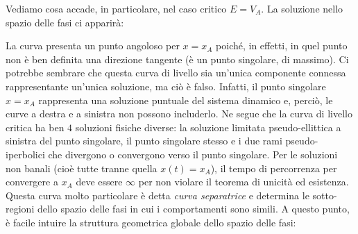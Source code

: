 \documentclass[a4paper,openany]{article}
\begin{document}
	Vediamo cosa accade, in particolare, nel caso critico $E=V_{A}$. La soluzione nello spazio delle fasi ci apparirà:
	\begin{figure}[H]
		\centering
	\end{figure}
	La curva presenta un punto angoloso per $x = x_{A}$ poiché, in effetti, in quel punto non è ben definita una direzione tangente (è un punto singolare, di massimo). Ci potrebbe sembrare che questa curva di livello sia un'unica componente connessa rappresentante un'unica soluzione, ma ciò è falso. Infatti, il punto singolare $x=x_{A}$ rappresenta una soluzione puntuale del sistema dinamico e, perciò, le curve a destra e a sinistra non possono includerlo. Ne segue che la curva di livello critica ha ben $4$ soluzioni fisiche diverse: la soluzione limitata pseudo-ellittica a sinistra del punto singolare, il punto singolare stesso e i due rami pseudo-iperbolici che divergono o convergono verso il punto singolare. Per le soluzioni non banali (cioè tutte tranne quella $x(t) = x_{A}$), il tempo di percorrenza per convergere a $x_{A}$ deve essere $\infty$ per non violare il teorema di unicità ed esistenza. Questa curva molto particolare è detta \textit{curva separatrice} e determina le sotto-regioni dello spazio delle fasi in cui i comportamenti sono simili. A questo punto, è facile intuire la struttura geometrica globale dello spazio delle fasi:
	\begin{figure}[H]
		\centering
		\label{SpazioFasiPotenzialeMinimoMassimo}
	\end{figure}
\end{document}
